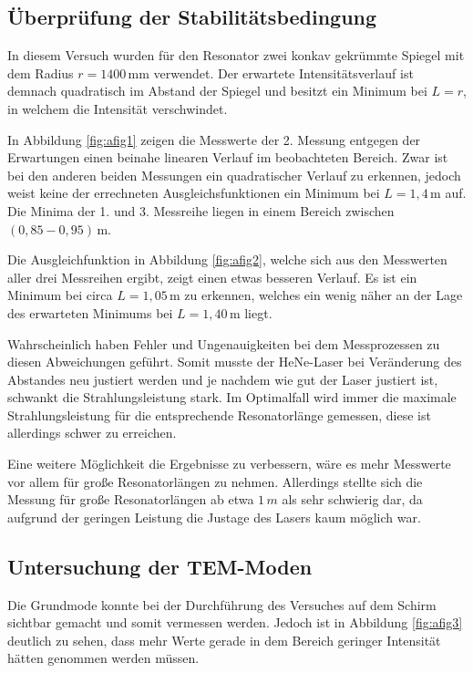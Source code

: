 \subsection*{Überprüfung der Stabilitätsbedingung}
In diesem Versuch wurden für den Resonator zwei konkav gekrümmte Spiegel mit dem Radius $r=1400\,\si{\mm}$ verwendet.
Der erwartete Intensitätsverlauf ist demnach quadratisch im Abstand der Spiegel und besitzt ein Minimum bei $L = r$, in welchem die Intensität verschwindet.

In Abbildung \ref{fig:afig1} zeigen die Messwerte der 2. Messung entgegen der Erwartungen einen beinahe linearen Verlauf im beobachteten Bereich. 
Zwar ist bei den anderen beiden Messungen ein quadratischer Verlauf zu erkennen, jedoch weist keine der errechneten Ausgleichsfunktionen ein Minimum bei $L = 1,4\,\si{\m}$ auf.
Die Minima der 1. und 3. Messreihe liegen in einem Bereich zwischen $(0,85-0,95)\,\si{\m}$.

Die Ausgleichfunktion in Abbildung \ref{fig:afig2}, welche sich aus den Messwerten aller drei Messreihen ergibt, zeigt einen etwas besseren Verlauf.
Es ist ein Minimum bei circa $L=1,05\,\si{\m}$ zu erkennen, welches ein wenig näher an der Lage des erwarteten Minimums bei $L=1,40\,\si{\m}$ liegt.

Wahrscheinlich haben Fehler und Ungenauigkeiten bei dem Messprozessen zu diesen Abweichungen geführt.
Somit musste der HeNe-Laser bei Veränderung des Abstandes neu justiert werden und je nachdem wie gut der Laser justiert ist, schwankt die Strahlungsleistung stark.
Im Optimalfall wird immer die maximale Strahlungsleistung für die entsprechende Resonatorlänge gemessen, diese ist allerdings schwer zu erreichen.

Eine weitere Möglichkeit die Ergebnisse zu verbessern, wäre es mehr Messwerte vor allem für große Resonatorlängen zu nehmen.
Allerdings stellte sich die Messung für große Resonatorlängen ab etwa $1\,\si{m}$ als sehr schwierig dar, da aufgrund der geringen Leistung die Justage des Lasers kaum möglich war.


\subsection*{Untersuchung der TEM-Moden}
Die Grundmode konnte bei der Durchführung des Versuches auf dem Schirm sichtbar gemacht und somit vermessen werden. 
Jedoch ist in Abbildung \ref{fig:afig3} deutlich zu sehen, dass mehr Werte gerade in dem Bereich geringer Intensität hätten genommen werden müssen.

